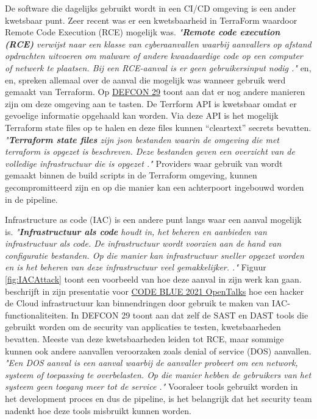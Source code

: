 De software die dagelijks gebruikt wordt in een CI/CD omgeving is een ander kwetsbaar punt. Zeer recent was er een kwetsbaarheid in TerraForm waardoor Remote Code Execution (RCE) mogelijk was. {\centering\textit{"\textbf{Remote code execution (RCE)} verwijst naar een klasse van cyberaanvallen waarbij aanvallers op afstand opdrachten uitvoeren om malware of andere kwaadaardige code op een computer of netwerk te plaatsen. Bij een RCE-aanval is er geen gebruikersinput nodig \textcite{Baker2021}."}} \textcite{Suezawa2021} en, \textcite{Kaskasoli2021} en, \textcite{Frank2021} spreken allemaal over de aanval die mogelijk was wanneer gebruik werd gemaakt van Terraform. Op \href{https://defcon.org/html/defcon-29/dc-29-index.html}{DEFCON 29} toont \textcite{Ahmed2021} aan dat er nog andere manieren zijn om deze omgeving aan te tasten. De Terrform API is kwetsbaar omdat er gevoelige informatie opgehaald kan worden. Via deze API is het mogelijk Terraform state files op te halen en deze files kunnen “cleartext” secrets bevatten. {\centering\textit{"\textbf{Terraform state files} zijn json bestanden waarin de omgeving die met terraform is opgezet is beschreven. Deze bestanden geven een overzicht van de volledige infrastructuur die is opgezet \autocite{Salecha2023}."}} Providers waar gebruik van wordt gemaakt binnen de build scripts in de Terraform omgeving, kunnen gecompromitteerd zijn en op die manier kan een achterpoort ingebouwd worden in de pipeline.
\clearpage

Infrastructure as code (IAC) is een andere punt langs waar een aanval mogelijk is. \textit{"\textbf{Infrastructuur als code} houdt in, het beheren en aanbieden van infrastructuur als code. De infrastructuur wordt voorzien aan de hand van configuratie bestanden. Op die manier kan infrastructuur sneller opgezet worden en is het beheren van deze infrastructuur veel gemakkelijker. \autocite{Huettermann2012}."} Figuur \ref{fig:IACAttack} toont een voorbeeld van hoe deze aanval in zijn werk kan gaan. \textcite{Suezawa} beschrijft in zijn presentatie voor \href{https://codeblue.jp/2021/en/}{CODE BLUE 2021 OpenTalks} hoe een hacker de Cloud infrastructuur kan binnendringen door gebruik te maken van IAC-functionaliteiten. In DEFCON 29 toont \textcite{Bar2021} aan dat zelf de SAST en DAST tools die gebruikt worden om de security van applicaties te testen, kwetsbaarheden bevatten. Meeste van deze kwetsbaarheden leiden tot RCE, maar sommige kunnen ook andere aanvallen veroorzaken zoals denial of service (DOS) aanvallen. \textit{"Een DOS aanval is een aanval waarbij de aanvaller probeert om een network, systeem of toepassing te overbelasten. Op die manier hebben de gebruikers van het systeem geen toegang meer tot de service \autocite{LenaertsBergmans2023}."} Vooraleer tools gebruikt worden in het development proces en dus de pipeline, is het belangrijk dat het security team nadenkt hoe deze tools misbruikt kunnen worden.

